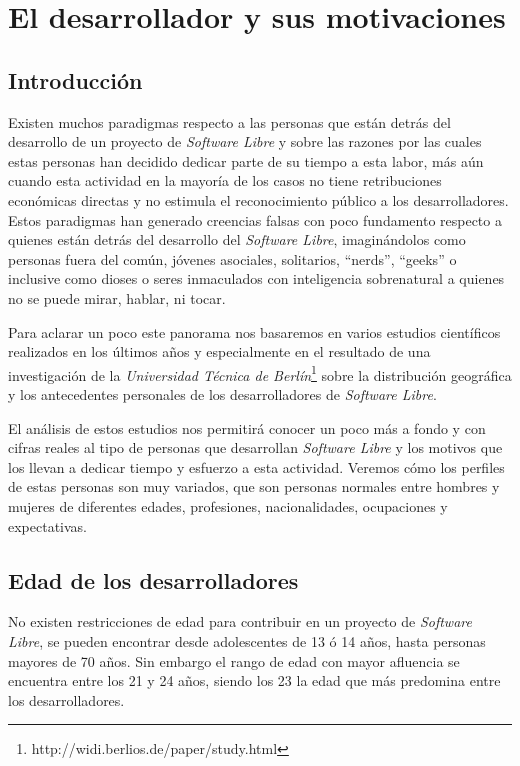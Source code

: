 \chapter{El desarrollador y sus motivaciones}
\label{CHAP3:Developer}
\section{Introducción}

Existen muchos paradigmas respecto a las personas que están detrás del desarrollo de un proyecto de \textit{Software Libre} y sobre las razones por las cuales estas personas han decidido dedicar parte de su tiempo a esta labor, más aún cuando esta actividad en la mayoría de los casos no tiene retribuciones económicas directas y no estimula el reconocimiento público a los desarrolladores. Estos paradigmas han generado creencias falsas con poco fundamento respecto a quienes están detrás del desarrollo del \textit{Software Libre}, imaginándolos como personas fuera del común, jóvenes asociales, solitarios, “nerds”, “geeks” o inclusive como dioses o seres inmaculados con inteligencia sobrenatural a quienes no se puede mirar, hablar, ni tocar.

Para aclarar un poco este panorama nos basaremos en varios estudios científicos realizados en los últimos años y especialmente en el resultado de una investigación de la \textit{Universidad Técnica de Berlín}\footnote{ http://widi.berlios.de/paper/study.html } sobre la distribución geográfica y los antecedentes personales de los desarrolladores de \textit{Software Libre}. 

El análisis de estos estudios nos permitirá conocer un poco más a fondo y con cifras reales al tipo de personas que desarrollan \textit{Software Libre} y los motivos que los llevan a dedicar tiempo y esfuerzo a esta actividad. Veremos cómo los perfiles de estas personas son muy variados, que son personas normales entre hombres y mujeres de diferentes edades, profesiones, nacionalidades, ocupaciones y expectativas.

\section{Edad de los desarrolladores}

No existen restricciones de edad para contribuir en un proyecto de \textit{Software Libre}, se pueden encontrar desde adolescentes de 13 ó 14 años, hasta personas mayores de 70 años. Sin embargo el rango de edad con mayor afluencia se encuentra entre los 21 y 24 años, siendo los 23 la edad que más predomina entre los desarrolladores. 

